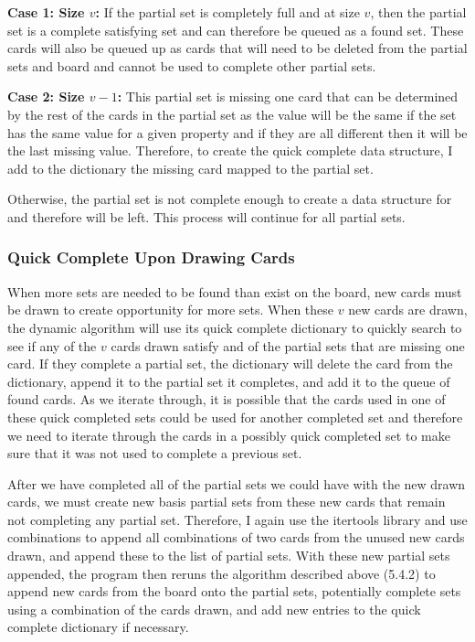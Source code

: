 \documentclass[pageno]{jpaper}
\begin{document}
\textbf{Case 1: Size $v$:} If the partial set is completely full and at size $v$, then the partial set is a complete satisfying set and can therefore be queued as a found set. These cards will also be queued up as cards that will need to be deleted from the partial sets and board and cannot be used to complete other partial sets.

\textbf{Case 2: Size $v-1$:} This partial set is missing one card that can be determined by the rest of the cards in the partial set as the value will be the same if the set has the same value for a given property and if they are all different then it will be the last missing value. Therefore, to create the quick complete data structure, I add to the dictionary the missing card mapped to the partial set. 

Otherwise, the partial set is not complete enough to create a data structure for and therefore will be left. This process will continue for all partial sets. 


\subsubsection{Quick Complete Upon Drawing Cards}

When more sets are needed to be found than exist on the board, new cards must be drawn to create opportunity for more sets. When these $v$ new cards are drawn, the dynamic algorithm will use its quick complete dictionary to quickly search to see if any of the $v$ cards drawn satisfy and of the partial sets that are missing one card. If they complete a partial set, the dictionary will delete the card from the dictionary, append it to the partial set it completes, and add it to the queue of found cards. As we iterate through, it is possible that the cards used in one of these quick completed sets could be used for another completed set and therefore we need to iterate through the cards in a possibly quick completed set to make sure that it was not used to complete a previous set. 

After we have completed all of the partial sets we could have with the new drawn cards, we must create new basis partial sets from these new cards that remain not completing any partial set. Therefore, I again use the itertools library and use combinations to append all combinations of two cards from the unused new cards drawn, and append these to the list of partial sets. With these new partial sets appended, the program then reruns the algorithm described above (5.4.2) to append new cards from the board onto the partial sets, potentially complete sets using a combination of the cards drawn, and add new entries to the quick complete dictionary if necessary. 
\end{document}
